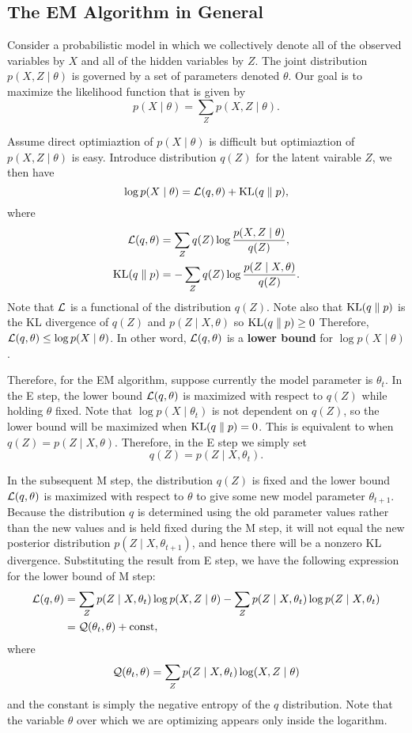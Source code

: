 \documentclass[a4paper]{article}
\begin{document}
\subsection{The EM Algorithm in General}

Consider a probabilistic model in which we collectively
denote all of the observed variables by $X$ and all of
the hidden variables by $Z$. The joint distribution
$p(X, Z \mid \theta)$ is governed by a set of parameters
denoted $\theta$. Our goal is to maximize the likelihood
function that is given by
\[
p(X \mid \theta) = \sum_Z p(X, Z \mid \theta).
\]

Assume direct optimiaztion of $p(X \mid \theta)$ is difficult
but optimiaztion of $p(X, Z \mid \theta)$ is easy.
Introduce distribution $q(Z)$ for the latent vairable $Z$,
we then have
\[
\log p(X \mid \theta) = \mathcal{L}(q, \theta) + \mathrm{KL}(q \; \Vert \; p),
\]
where
\[
\begin{aligned}
  \mathcal{L}(q, \theta) &= \sum_Z q(Z) \log \frac{p(X, Z \mid \theta)}{q(Z)}, \\
  \mathrm{KL}(q \; \Vert \; p) &= - \sum_Z q(Z) \log \frac{p(Z \mid X, \theta)}{q(Z)}.
\end{aligned}
\]
Note that $\mathcal{L}$ is a functional of the distribution $q(Z)$.
Note also that $\mathrm{KL}(q \; \Vert \; p)$ is the KL divergence of $q(Z)$
and $p(Z \mid X, \theta)$ so $\mathrm{KL}(q \; \Vert \; p) \geq 0$
Therefore, $\mathcal{L}(q, \theta) \leq \log p(X \mid \theta)$. In other word,
$\mathcal{L}(q, \theta)$ is a \textbf{lower bound}
for $\log p(X \mid \theta)$.

Therefore, for the EM algorithm, suppose currently the model
parameter is $\theta_t$. In the E step, the lower bound
$\mathcal{L}(q, \theta)$ is maximized with respect to $q(Z)$ while
holding $\theta$ fixed. Note that $\log p(X \mid \theta_t)$
is not dependent on $q(Z)$, so the lower bound will
be maximized when $\mathrm{KL}(q \; \Vert \; p) = 0$. This is equivalent to
when $q(Z) = p(Z \mid X, \theta)$. Therefore, in the E
step we simply set
\[
q(Z) = p(Z \mid X, \theta_t).
\]

In the subsequent M step, the distribution $q(Z)$ is fixed
and the lower bound $\mathcal{L}(q, \theta)$ is maximized with
respect to $\theta$ to give some new model parameter
$\theta_{t + 1}$. Because the distribution $q$ is determined
using the old parameter values rather than the new values
and is held fixed during the M step, it will not equal the
new posterior distribution $p(Z \mid X, \theta_{t+1})$,
and hence there will be a nonzero KL divergence.
Substituting the result from E step, we have the following
expression for the lower bound of M step:
\[
\begin{aligned}
  \mathcal{L}(q, \theta)
  &= \sum_Z p(Z \mid X, \theta_t) \log p(X, Z \mid \theta)
  - \sum_Z p(Z \mid X, \theta_t) \log p(Z \mid X, \theta_t) \\
  &= \mathcal{Q}(\theta_t, \theta) + \mathrm{const},
\end{aligned}
\]
where
\[
\mathcal{Q}(\theta_t, \theta) = \sum_Z p(Z \mid X, \theta_t)
\log (X, Z \mid \theta)
\]
and the constant is simply the negative entropy of
the $q$ distribution. Note that the variable $\theta$
over which we are optimizing appears only inside the
logarithm.
\end{document}
